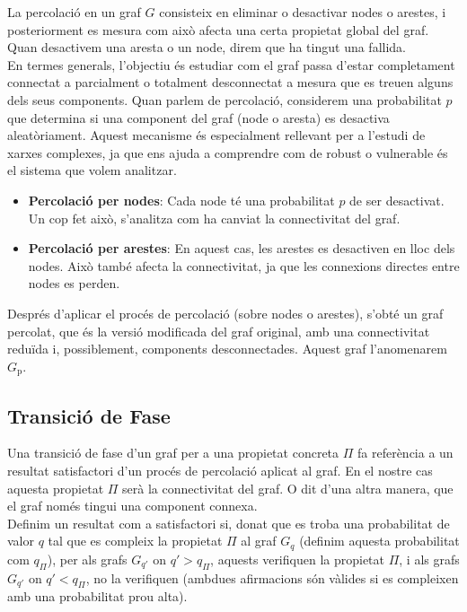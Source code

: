 \documentclass[a4paper]{article}
\begin{document}
	La percolació en un graf $G$ consisteix en eliminar o desactivar nodes o arestes, i posteriorment es mesura com això afecta una certa propietat global del graf. Quan desactivem una aresta o un node, direm que ha tingut una fallida. \\
	
	En termes generals, l'objectiu és estudiar com el graf passa d'estar completament connectat a parcialment o totalment desconnectat a mesura que es treuen alguns dels seus components. Quan parlem de percolació, considerem una probabilitat $p$ que determina si una component del graf (node o aresta) es desactiva aleatòriament. Aquest mecanisme és especialment rellevant per a l'estudi de xarxes complexes, ja que ens ajuda a comprendre com de robust o vulnerable és el sistema que volem analitzar.
	
	\begin{itemize}
		\item \textbf{Percolació per nodes}: Cada node té una probabilitat $p$ de ser desactivat. Un cop fet això, s'analitza com ha canviat la connectivitat del graf.
		\item \textbf{Percolació per arestes}: En aquest cas, les arestes es desactiven en lloc dels nodes. Això també afecta la connectivitat, ja que les connexions directes entre nodes es perden.
	\end{itemize}
	
	Després d'aplicar el procés de percolació (sobre nodes o arestes), s'obté un graf percolat, que és la versió modificada del graf original, amb una connectivitat reduïda i, possiblement, components desconnectades. Aquest graf l'anomenarem $G_{\text{p}}$.
	
	\subsection{Transició de Fase}
	
	Una transició de fase d'un graf per a una propietat concreta $\Pi$ fa referència a un resultat satisfactori d'un procés de percolació aplicat al graf. En el nostre cas aquesta propietat $\Pi$ serà la connectivitat del graf. O dit d'una altra manera, que el graf només tingui una component connexa. \\
	
	Definim un resultat com a satisfactori si, donat que es troba una probabilitat de valor $q$ tal que es compleix la propietat $\Pi$ al graf $G_q$ (definim aquesta probabilitat com $q_{\Pi}$), per als grafs $G_{q'}$ on $q' > q_{\Pi}$, aquests verifiquen la propietat $\Pi$, i als grafs $G_{q'}$ on $q' < q_{\Pi}$, no la verifiquen (ambdues afirmacions són vàlides si es compleixen amb una probabilitat prou alta). \\
	
\end{document}
